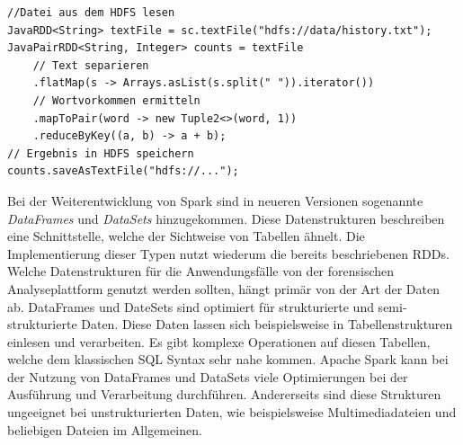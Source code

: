 \begin{lstlisting}[label={lst:spark_rdd_word_count},caption= Beispielimplementierung eines Spark RDDs ,captionpos=b,frame=single,style=customjava]
//Datei aus dem HDFS lesen
JavaRDD<String> textFile = sc.textFile("hdfs://data/history.txt");
JavaPairRDD<String, Integer> counts = textFile
    // Text separieren
    .flatMap(s -> Arrays.asList(s.split(" ")).iterator())
    // Wortvorkommen ermitteln
    .mapToPair(word -> new Tuple2<>(word, 1))
    .reduceByKey((a, b) -> a + b);
// Ergebnis in HDFS speichern
counts.saveAsTextFile("hdfs://...");
\end{lstlisting}


\noindent
Bei der Weiterentwicklung von Spark sind in neueren Versionen sogenannte \textit{DataFrames} und \textit{DataSets} hinzugekommen. Diese Datenstrukturen beschreiben eine Schnittstelle, welche der Sichtweise von Tabellen ähnelt. Die Implementierung dieser Typen nutzt wiederum die bereits beschriebenen RDDs.\\
Welche Datenstrukturen für die Anwendungsfälle von der forensischen Analyseplattform genutzt werden sollten, hängt primär von der Art der Daten ab.
DataFrames und DateSets sind optimiert für strukturierte und semi-strukturierte Daten. Diese Daten lassen sich beispielsweise in Tabellenstrukturen einlesen und verarbeiten. Es gibt komplexe Operationen auf diesen Tabellen, welche dem klassischen SQL Syntax sehr nahe kommen. Apache Spark kann bei der Nutzung von DataFrames und DataSets viele Optimierungen bei der Ausführung und Verarbeitung durchführen. Andererseits sind diese Strukturen ungeeignet bei unstrukturierten Daten, wie beispielsweise Multimediadateien und beliebigen Dateien im Allgemeinen.\cite[S. 66 ff.]{data_processing_spark2}\\

